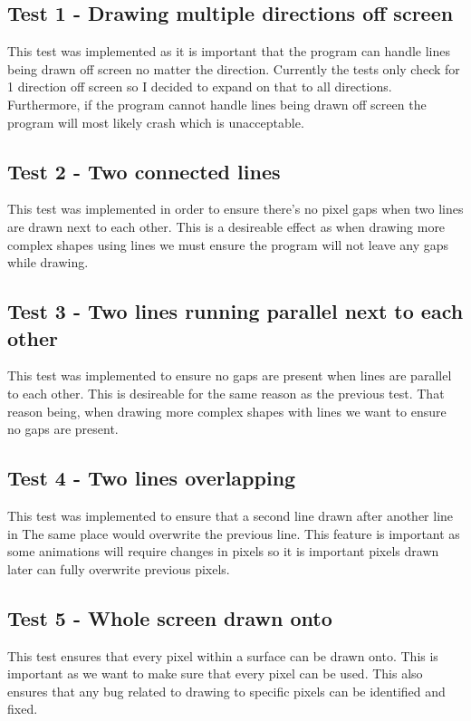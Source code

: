 \documentclass[
	a4paper, %
	10pt, %
]{CSUniSchoolLabReport}
\begin{document}
\subsection*{Test 1 {-} Drawing multiple directions off screen}
This test was implemented as it is important that the program can handle lines 
being drawn off screen no matter the direction. Currently the tests only check for 
1 direction off screen so I decided to expand on that to all directions. Furthermore, 
if the program cannot handle lines being drawn off screen the program will most likely
crash which is unacceptable.

\subsection*{Test 2 {-} Two connected lines}
This test was implemented in order to ensure there's no pixel gaps when two lines 
are drawn next to each other. This is a desireable effect as when drawing more 
complex shapes using lines we must ensure the program will not leave any gaps while
drawing.


\subsection*{Test 3 {-} Two lines running parallel next to each other}
This test was implemented to ensure no gaps are present when lines are parallel to each other.
This is desireable for the same reason as the previous test. That reason being, 
when drawing more complex shapes with lines we want to ensure no gaps are present.
\subsection*{Test 4 {-} Two lines overlapping}
This test was implemented to ensure that a second line drawn after another line in The
same place would overwrite the previous line. This feature is important as some animations
 will require changes in pixels so it is important pixels drawn later can fully overwrite
 previous pixels.
\subsection*{Test 5 {-} Whole screen drawn onto}
This test ensures that every pixel within a surface can be drawn onto. This is important
as we want to make sure that every pixel can be used. This also ensures that any bug 
related to drawing to specific pixels can be identified and fixed.
\end{document}
